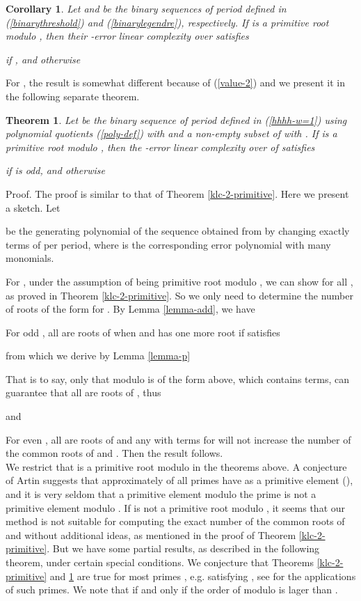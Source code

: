 \documentclass [11pt,a4paper]{article}
\newtheorem{theorem}{Theorem}
\newtheorem{corollary}{Corollary}
\begin{document}
\begin{corollary}
Let  and  be the binary sequences of period  defined in
(\ref{binarythreshold}) and (\ref{binarylegendre}), respectively. If  is a primitive root modulo , then
their -error linear complexity  over  satisfies

if , and otherwise

\end{corollary}



For , the result is somewhat different because of (\ref{value-2}) and we present it in the following separate
theorem.


\begin{theorem}\label{klc-2-primitive-w=1}
Let  be the binary sequence of period  defined in (\ref{hhhh-w=1}) using polynomial quotients (\ref{poly-def}) with  and a non-empty subset  of  with . If  is a primitive root modulo , then
the -error linear complexity  over  of   satisfies

if  is odd, and otherwise

\end{theorem}
Proof. The proof is similar to that of Theorem \ref{klc-2-primitive}. Here we present a sketch. Let

be the generating polynomial of the sequence obtained from  by changing exactly  terms of  per period,
where  is the corresponding error polynomial with  many  monomials.

For , under the assumption of  being primitive root modulo , we can show  for all , as proved in  Theorem \ref{klc-2-primitive}. So we only need to determine the number of roots of the form  for .
By Lemma \ref{lemma-add}, we have

For odd , all  are roots of  when  and
 has one more root if  satisfies

from which we derive by Lemma \ref{lemma-p}

That is to say, only that  modulo  is of the form above, which contains  terms, can guarantee that all  are roots of ,
thus

and

For even , all  are roots of   and any  with  terms for   will not increase
the number of the common roots of  and . Then the result follows. ~\hfill \\


We restrict that  is a primitive root modulo  in the theorems above. A
conjecture of Artin suggests that approximately  of all primes
have  as a primitive element (\cite[p.81]{Shanks}), and it is
very seldom that a primitive element modulo the prime  is not
 a primitive element modulo .
If  is not a primitive root modulo , it seems that our method is not suitable for computing the exact number of the common roots of   and  without additional ideas, as mentioned in the proof of Theorem \ref{klc-2-primitive}. But we have some partial results, as described in the following theorem, under certain special conditions. We conjecture that Theorems \ref{klc-2-primitive} and \ref{klc-2-primitive-w=1} are true for most primes , e.g.  satisfying , see \cite{CDP1997,CD} for the applications of such primes. We note that  if and only if the order of  modulo  is lager than .
\end{document}
